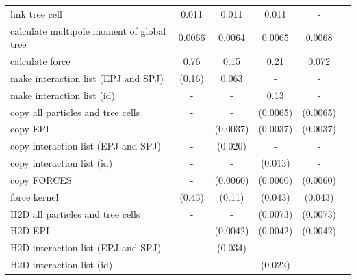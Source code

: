 \documentclass[dvipdfmx]{pasj01}
\begin{document}
\begin{table}
\begin{tabular}{lccccc}
    \hspace{8dd} link tree cell                       & 0.011   & 0.011    & 0.011    & -      \\
    calculate multipole moment of global tree         & 0.0066  & 0.0064   & 0.0065   & 0.0068  \\
    calculate force                                   & 0.76    & 0.15     & 0.21     & 0.072   \\
    \hspace{8dd} make interaction list (EPJ and SPJ)  & (0.16)  & 0.063    & -        & -        \\
    \hspace{8dd} make interaction list (id)           & -       & -        & 0.13    & -        \\
    \hspace{8dd} copy all particles and tree cells    & -       & -        & (0.0065) & (0.0065) \\ 
    \hspace{8dd} copy EPI                             & -       & (0.0037) & (0.0037) & (0.0037) \\ 
    \hspace{8dd} copy interaction list (EPJ and SPJ)  & -       & (0.020)  & -        & -        \\ 
    \hspace{8dd} copy interaction list (id)           & -       & -        & (0.013)  & -        \\ 
    \hspace{8dd} copy FORCES                          & -       & (0.0060) & (0.0060) & (0.0060) \\ 
    \hspace{8dd} force kernel                         & (0.43)  & (0.11)   & (0.043)  & (0.043)  \\
    \hspace{8dd} H2D all particles and tree cells     & -       & -        & (0.0073) & (0.0073) \\ 
    \hspace{8dd} H2D EPI                              & -       & (0.0042) & (0.0042) & (0.0042)  \\  
    \hspace{8dd} H2D interaction list (EPJ and SPJ)   & -       & (0.034)  & -        & -         \\  
    \hspace{8dd} H2D interaction list (id)            & -       & -        & (0.022)  & -         \\  

\end{tabular}
\end{table}
\end{document}
